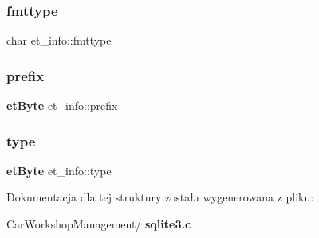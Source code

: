 \mbox{\label{structet__info_a1740af27f0c9d5840e7dda59a129aa4b}} 
\subsubsection{fmttype}
{\footnotesize\ttfamily char et\+\_\+info\+::fmttype}

\mbox{\label{structet__info_a23cc866bf202c34e49bd49599b051628}} 
\subsubsection{prefix}
{\footnotesize\ttfamily \textbf{ et\+Byte} et\+\_\+info\+::prefix}

\mbox{\label{structet__info_a148bd1efa49018c9a723701ba5747825}} 
\subsubsection{type}
{\footnotesize\ttfamily \textbf{ et\+Byte} et\+\_\+info\+::type}



Dokumentacja dla tej struktury została wygenerowana z pliku\+:\begin{DoxyCompactItemize}
\item 
Car\+Workshop\+Management/\textbf{ sqlite3.\+c}\end{DoxyCompactItemize}
